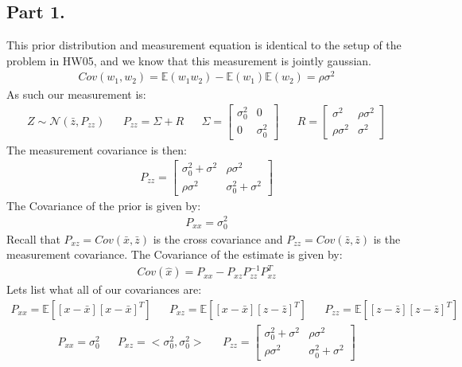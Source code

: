 \documentclass{article}
\begin{document}
\subsection*{Part 1.}
This prior distribution and measurement equation is identical to the setup of the problem in HW05, and we know that this measurement is jointly gaussian.
\begin{align*}
Cov(w_1,w_2) = \mathbb{E}(w_1 w_2) - \mathbb{E}(w_1)\mathbb{E}(w_2) = \rho \sigma^2
\end{align*}
As such our measurement is:
\begin{align*}
Z \sim \mathcal{N}(\bar{z},P_{zz}) && P_{zz} = \Sigma+R && \Sigma = \begin{bmatrix} \sigma^2_0 & 0 \\
                                                   0 & \sigma^2_0 \end{bmatrix}                                                   
                                                   && R = \begin{bmatrix} \sigma^2 & \rho \sigma^2 \\
                                                          \rho \sigma^2 & \sigma^2 \end{bmatrix}
\end{align*}
The measurement covariance is then:
\begin{align*}
P_{zz} = \begin{bmatrix} \sigma^2_0+ \sigma^2 & \rho \sigma^2 \\
          \rho \sigma^2 & \sigma^2_0+ \sigma^2 \end{bmatrix}
\end{align*}
The Covariance of the prior is given by:
\begin{align*}
P_{xx} = \sigma^2_0
\end{align*}
Recall that $P_{xz}=Cov(\bar{x},\bar{z})$ is the cross covariance and $P_{zz}=Cov(\bar{z},\bar{z})$ is the measurement covariance. The Covariance of the estimate is given by:
\begin{align*}
Cov(\hat{x}) = P_{xx} - P_{xz} P_{zz}^{-1} P_{xz}^T
\end{align*}
Lets list what all of our covariances are:
\begin{align*}
P_{xx} = \mathbb{E}[[x-\bar{x}][x-\bar{x}]^T] && P_{xz} = \mathbb{E}[[x-\bar{x}][z-\bar{z}]^T] && P_{zz} = \mathbb{E}[[z-\bar{z}][z-\bar{z}]^T]
\end{align*}
\begin{align*}
P_{xx} = \sigma^2_0 && P_{xz} = <\sigma^2_0, \sigma^2_0> && P_{zz} = \begin{bmatrix} \sigma^2_0+ \sigma^2 & \rho \sigma^2 \\
          																																\rho \sigma^2 & \sigma^2_0+ \sigma^2 \end{bmatrix}
\end{align*}
\end{document}
